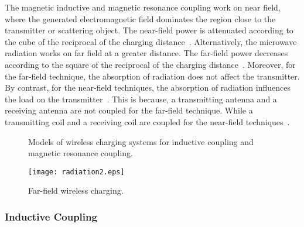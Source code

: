 \documentclass[twocolumn,10pt]{IEEEtran}
\begin{document}
The magnetic inductive and magnetic resonance coupling work on near field, where the generated electromagnetic field dominates the region close to the transmitter or scattering object. The near-field power is attenuated according to the cube of the reciprocal of the charging distance~\cite{X.LuSurvey}. 
Alternatively, the microwave radiation works on far field at a greater distance. The far-field power decreases according to the square of the reciprocal of the charging distance~\cite{X.LuSurvey}. Moreover, for the far-field technique, the absorption of radiation does not affect the transmitter. By contrast, for the near-field techniques, the absorption of radiation influences the load on the transmitter~\cite{N.2012Shinohara}. 
This is because, a transmitting antenna and a
receiving antenna are not coupled for the far-field technique. While a transmitting coil and a
receiving coil are coupled for the near-field techniques~\cite{2011NShinohara}.

\begin{figure*} 
 \centering
  \centering
   \centering
\caption{Models of wireless charging systems for inductive coupling and magnetic resonance coupling.} 
 \label{receiver_designs}
 \end{figure*}
 
 
 
\begin{figure*}
\centering
\texttt{[image: radiation2.eps]}
\caption{Far-field wireless charging.} \label{microwave}
\end{figure*}
 
\subsubsection{Inductive Coupling}
\end{document}
